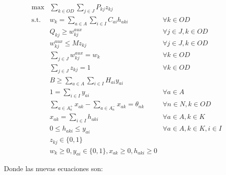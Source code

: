 \documentclass{article}
\begin{document}
  \begin{align}
    \text{max}    & \sum_{k \in OD} \sum_{j \in J} P_{kj} z_{kj}                          & \label{eq:objectivefinalalt} \\
    \text{s.t.}\; & w_k = \sum_{a \in A} \sum_{i \in I} C_{ai}h_{aki}                     & \forall k \in OD \label{eq:shortestpathaltfinal} \\
                  & Q_{kj} \geq w^{aux}_{kj}                                              & \forall j \in J, k \in OD \label{eq:breakpointsalt} \\
                  & w^{aux}_{kj} \leq M z_{kj}                                            & \forall j \in J, k \in OD \\
                  & \sum_{j \in J} w^{aux}_{kj} = w_k                                     & \forall k \in OD \\
                  & \sum_{j \in J} z_{kj} = 1                                             & \forall k \in OD \label{eq:singularbreakpointalt} \\
                  & B \geq \sum_{a \in A} \sum_{i \in I} H_{ai}y_{ai}                     & \label{eq:respectbudgetaltfinal} \\
                  & 1 = \sum_{i \in I} y_{ai}                                             & \forall a \in A \label{eq:alwaysoneyaltfinal} \\
                  & \sum_{a \in A_n^+} x_{ak} - \sum_{a \in A_n^-} x_{ak} = \theta_{nk}   & \forall n \in N, k \in OD \label{eq:flowbalancealtfinal} \\
                  & x_{ak} = \sum_{i \in I} h_{aki}                                       & \forall a \in A, k \in K \label{eq:flowactivationalt} \\
                  & 0 \leq h_{aki} \leq y_{ai}                                            & \forall a \in A, k \in K, i \in I \label{eq:respectinfraalt} \\
                  & z_{kj} \in \{0,1\}                                                    & \nonumber \\
                  & w_k \geq 0, y_{ai} \in \{0,1\}, x_{ak} \geq 0, h_{aki} \geq 0         & \nonumber
  \end{align}

  Donde las nuevas ecuaciones son:
\end{document}
